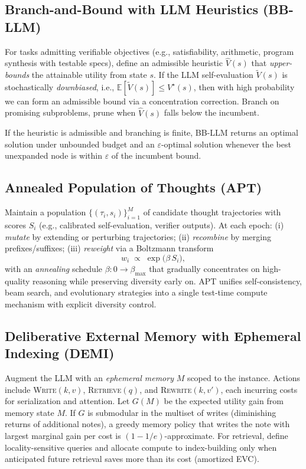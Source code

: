 \documentclass[11pt]{article}
\newcommand{\E}{\mathbb{E}}
\newcommand{\1}{\mathbb{I}}
\begin{document}
\subsection{Branch-and-Bound with LLM Heuristics (BB-LLM)}

For tasks admitting verifiable objectives (e.g., satisfiability, arithmetic, program synthesis with testable specs), define an admissible heuristic $\hat{V}(s)$ that \emph{upper-bounds} the attainable utility from state $s$. If the LLM self-evaluation $\tilde{V}(s)$ is stochastically \emph{downbiased}, i.e., $\E[\tilde{V}(s)] \le V^\star(s)$, then with high probability we can form an admissible bound via a concentration correction. 
Branch on promising subproblems, prune when $\hat{V}(s)$ falls below the incumbent.
\begin{proposition}
If the heuristic is admissible and branching is finite, BB-LLM returns an optimal solution under unbounded budget and an $\varepsilon$-optimal solution whenever the best unexpanded node is within $\varepsilon$ of the incumbent bound.
\end{proposition}

\subsection{Annealed Population of Thoughts (APT)}

Maintain a population $\{(\tau_i, s_i)\}_{i=1}^M$ of candidate thought trajectories with scores $S_i$ (e.g., calibrated self-evaluation, verifier outputs).
At each epoch: (i) \emph{mutate} by extending or perturbing trajectories; (ii) \emph{recombine} by merging prefixes/suffixes; (iii) \emph{reweight} via a Boltzmann transform
\begin{equation}
w_i \;\propto\; \exp\!\big( \beta\, S_i \big),
\end{equation}
with an \emph{annealing} schedule $\beta: 0 \to \beta_{\max}$ that gradually concentrates on high-quality reasoning while preserving diversity early on.
APT unifies self-consistency, beam search, and evolutionary strategies into a single test-time compute mechanism with explicit diversity control.

\subsection{Deliberative External Memory with Ephemeral Indexing (DEMI)}

Augment the LLM with an \emph{ephemeral memory} $M$ scoped to the instance. Actions include \textsc{Write}$(k,v)$, \textsc{Retrieve}$(q)$, and \textsc{Rewrite}$(k,v')$, each incurring costs for serialization and attention. 
Let $G(M)$ be the expected utility gain from memory state $M$. If $G$ is submodular in the multiset of writes (diminishing returns of additional notes), a greedy memory policy that writes the note with largest marginal gain per cost is $(1-1/e)$-approximate. 
For retrieval, define locality-sensitive queries and allocate compute to index-building only when anticipated future retrieval saves more than its cost (amortized EVC).
\end{document}
